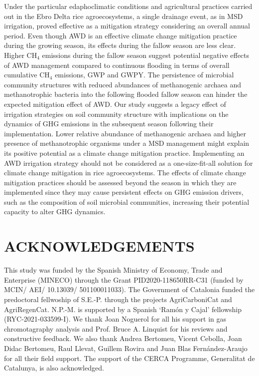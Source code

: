 Under the particular edaphoclimatic conditions and agricultural practices carried out in the Ebro Delta rice agroecosystems, 
a single drainage event, as in MSD irrigation, proved effective as a mitigation strategy considering an overall annual period. Even though AWD is an effective climate change mitigation practice during the growing season, its effects during the fallow season are less clear. Higher CH$_{4}$ emissions during the fallow season suggest potential negative effects of AWD management compared to continuous flooding in terms of overall cumulative CH$_{4}$ emissions, GWP and GWPY. %
The persistence of microbial community structures with reduced abundances of methanogenic archaea and methanotrophic bacteria into the following flooded fallow season can hinder the expected mitigation effect of AWD. Our study suggests a legacy effect of irrigation strategies on soil community structure with implications on the dynamics of GHG emissions in the subsequent season following their implementation. Lower relative abundance of methanogenic archaea and higher presence of methanotrophic organisms under a MSD management might explain its positive potential as a climate change mitigation practice. Implementing an AWD irrigation strategy should not be considered as a one-size-fit-all solution for climate change mitigation in rice agroecosystems. The effects of climate change mitigation practices should be assessed beyond the season in which they are implemented since they may cause persistent effects on GHG emission drivers, such as the composition of soil microbial communities, increasing their potential capacity to alter GHG dynamics.\\

\section*{ACKNOWLEDGEMENTS}
\label{sec:ackn2}

This study was funded by the Spanish Ministry of Economy, Trade and Enterprise (MINECO) through the Grant PID2020-118650RR-C31 (funded by MCIN/ AEI/ 10.13039/ 501100011033). The Government of Catalonia funded the predoctoral fellwoship of S.E.-P. through the projects AgriCarboniCat and AgriRegenCat. N.P.-M. is supported by a Spanish ‘Ramón y Cajal’ fellowship (RYC-2021-033599-I). We thank Joan Noguerol for all his support in gas chromotagraphy analysis and Prof. Bruce A. Linquist for his reviews and constructive feedback. We also thank Andrea Bertomeu, Vicent Cebolla, Joan Didac Bertomeu, Raul Llevat, Guillem Rovira and Juan Blas Fernández-Araujo for all their field support. The support of the CERCA Programme, Generalitat de Catalunya, is also acknowledged.

